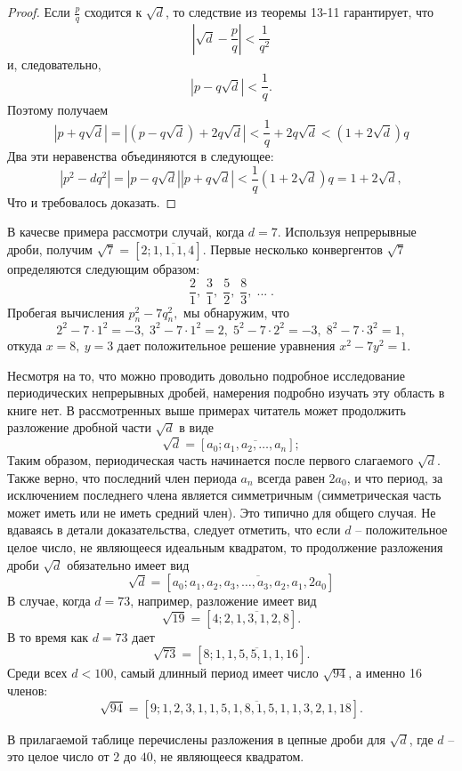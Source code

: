 \documentclass[twoside,12pt]{article}
\begin{document}
\begin{proof} Если $\frac{p}{q}$ сходится к $\sqrt{d}$, то следствие из теоремы 13-11 гарантирует, что 
\[ |\sqrt{d} - \frac{p}{q}| < \frac{1}{q^2} \] 
\noindent и, следовательно, 
\[|p - q\sqrt{d}| < \frac{1}{q}. \] 
\noindent Поэтому получаем
\[|p + q\sqrt{d}| = |(p -q\sqrt{d}) + 2q\sqrt{d}| < \frac{1}{q} + 2q\sqrt{d}  < (1 + 2\sqrt{d})q\] 
\noindent Два эти неравенства объединяются в следующее:
\[|p^2 - dq^2| = |p - q\sqrt{d}| |p + q\sqrt{d} | < \frac{1}{q}(1 + 2\sqrt{d})q = 1 + 2\sqrt{d}, \] 
\noindent Что и требовалось доказать. 
\end{proof}
\par В качесве примера рассмотри случай, когда $d = 7$. Используя непрерывные дроби, получим $\sqrt{7} = [2;\overline{1,1,1,4}]$. Первые несколько конвергентов $\sqrt{7}$ определяются следующим образом:
\[ \frac{2}{1}, \; \frac{3}{1}, \; \frac{5}{2}, \; \frac{8}{3}, \; ... \;. \] 
\noindent Пробегая вычисления $p_n^2 - 7q_n^2 ,$ мы обнаружим, что
\[2^2 - 7\cdot 1^2 = -3, \; 3^2 - 7\cdot 1^2 = 2, \; 5^2 - 7 \cdot 2^2 = -3, \; 8^2 - 7\cdot 3^2 =1, \] 
\noindent откуда $ x = 8, \: y = 3$ дает положительное решение уравнения $x^2 - 7y^2 = 1.$ 
\par Несмотря на то, что можно проводить довольно подробное исследование периодических непрерывных дробей, намерения подробно изучать эту область в книге нет. В рассмотренных выше примерах читатель может продолжить разложение дробной части $\sqrt{d}$ в виде
\[\sqrt{d} = [a_0;\overline{a_1,a_2,\ldots,a_n}];\] 
\noindent Таким образом, периодическая часть начинается после первого слагаемого $\sqrt{d}$. Также верно, что последний член периода $a_n$ всегда равен $2a_0$, и что период, за исключением последнего члена является симметричным (симметрическая часть может иметь или не иметь средний член). Это типично для общего случая.
Не вдаваясь в детали доказательства, следует отметить, что если $d$ -- положительное целое число, не являющееся идеальным квадратом, то продолжение разложения дроби $\sqrt{d}$ обязательно имеет вид
\[\sqrt{d} = [a_0; \overline{a_1, a_2, a_3, \ldots , a_3,a_2,a_1,2a_0}] \]
\noindent В случае, когда $d = 73$, например, разложение имеет вид
\[\sqrt{19} = [4; \overline{2,1,3,1,2,8}].\]
\noindent В то время как $d = 73$ дает
\[\sqrt{73} = [8;\overline{1,1,5,5,1,1,16}].\]
\noindent Среди всех $d<100$, самый длинный период имеет число $\sqrt{94}$, а именно 16 членов:
\[\sqrt{94} = [9;\overline{1,2,3,1,1,5,1,8,1,5,1,1,3,2,1,18}].\]
\par В прилагаемой таблице перечислены разложения в цепные дроби для $\sqrt{d}$, где $d$ -- это целое число от $2$ до $40$, не являющееся квадратом.
\end{document}
